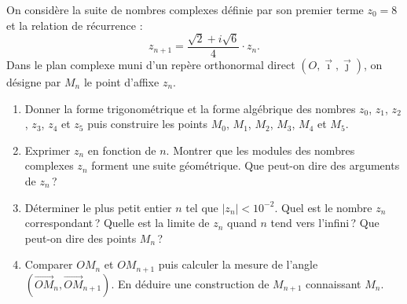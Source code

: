 \begin{exo}
      On consid\`ere la suite de nombres complexes d\'efinie par son premier terme $z_0=8$ et la relation de r\'ecurrence :
            \[
                  z_{n+1} = \frac{\sqrt{2}+i\sqrt{6}}{4} \cdot z_n      .
            \]
      Dans le plan complexe muni d'un rep\`ere orthonormal direct $(O,\vec{\imath},\vec{\jmath})$,
      on d\'esigne par $M_n$ le point d'affixe $z_n$.
      \begin{enumerate}
            \item Donner la forme trigonom\'etrique et la forme alg\'ebrique des nombres       
                  $z_0$, $z_1$, $z_2$, $z_3$, $z_4$ et $z_5$
                  puis construire les points 
                  $M_0$, $M_1$, $M_2$, $M_3$, $M_4$ et $M_5$.
            \item Exprimer $z_n$ en fonction de $n$.
                  Montrer que les modules des nombres complexes $z_n$ forment une suite g\'eom\'etrique.
                  Que peut-on dire des arguments de $z_n$\,?
            \item D\'eterminer le plus petit entier $n$ tel que $|z_n| < 10^{-2}$.
                  Quel est le nombre $z_n$ correspondant\,?
                  Quelle est la limite de $z_n$ quand $n$ tend vers l'infini\,?
                  Que peut-on dire des points $M_n$\,?
            \item Comparer $OM_n$ et $OM_{n+1}$ puis calculer la mesure de l'angle 
                  $ \left( \overrightarrow{OM}_n,\overrightarrow{OM}_{n+1} \right)$.
                  En d\'eduire une construction de $M_{n+1}$ connaissant $M_n$.
      \end{enumerate}
\end{exo}
%
